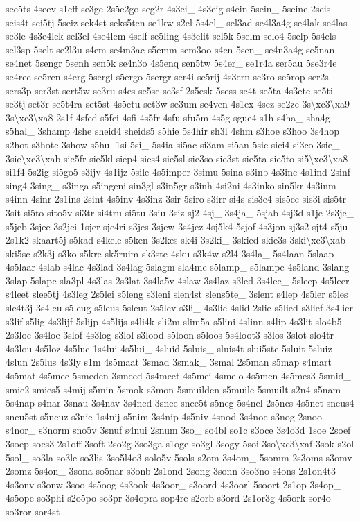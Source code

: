 \begin{DoxyCompactItemize}
see5ts 4seev s1eff se3ge 2s5e2go seg2r 4s3ei\-\_\- 4s3eig s4ein 5sein\-\_\- 5seine 2seis seis4t sei5tj 5seiz sek4st seks5ten se1kw s2el 5s4el\-\_\- sel3ad se4l3a4g se4lak se4las se3le 4s3e4lek sel3el 4se4lem 4self se5ling 4s3elit sel5k 5selm selo4 5selp 5s4els sel3sp 5selt se2l3u s4em se4m3ac s5emm sem3oo s4en 5sen\-\_\- se4n3a4g se5nan se4net 5sengr 5senh sen5k se4n3o 4s5enq sen5tw 5s4er\-\_\- se1r4a ser5au 5se3r4e se4ree se5ren s4erg 5sergl s5ergo 5sergr ser4i se5rij 4s3ern se3ro se5rop ser2s sers3p ser3st sert5w se3ru s4es se5sc se3sf 2s5esk 5sess se4t se5ta 4s3ete se5ti se3tj set3r se5t4ra set5st 4s5etu set3w se3um se4ven 4s1ex 4sez se2ze 3s\textbackslash{}xc3\textbackslash{}xa9 3s\textbackslash{}xc3\textbackslash{}xa8 2s1f 4sfed s5fei 4sfi 4s5fr 4sfu sfu5m 4s5g sgue4 s1h s4ha\-\_\- sha4g s5hal\-\_\- 3shamp 4she sheid4 sheids5 s5hie 5s4hir sh3l 4shm s3hoe s3hoo 3s4hop s2hot s3hote 3show s5hul 1si 5si\-\_\- 5s4ia si5ac si3am si5an 5sic sici4 si3co 3sie\-\_\- 3sie\textbackslash{}xc3\textbackslash{}xab sie5fr sie5kl siep4 sies4 sie5sl sie3so sie3st sie5ta sie5to si5\textbackslash{}xc3\textbackslash{}xa8 si1f4 5s2ig si5go5 s3ijv 4s1ijz 5sile 4s5imper 3simu 5sina s3inb 4s3inc 4s1ind 2sinf sing4 3sing\-\_\- s3inga s5ingeni sin3gl s3in5gr s3inh 4si2ni 4s3inko sin5kr 4s3inm s4inn 4sinr 2s1ins 2sint 4s5inv 4s3inz 3sir 5siro s3irr si4s sis3e4 sis5ee sis3i sis5tr 3sit si5to sito5v si3tr si4tru si5tu 3siu 3siz sj2 4sj\-\_\- 3s4ja\-\_\- 5sjab 4sj3d s1je 2s3je\-\_\- s5jeb 3sjee 3s2jei 1sjer sje4ri s3jes 3sjew 3s4jez 4sj5k4 5sjof 4s3jon sj3s2 sjt4 s5ju 2s1k2 skaart5j s5kad s4kele s5ken 3s2kes sk4i 3s2ki\-\_\- 3skied skie3s 3ski\textbackslash{}xc3\textbackslash{}xab ski5sc s2k3j s3ko s5kre sk5ruim sk3ste 4sku s3k4w s2l4 3s4la\-\_\- 5s4laan 5slaap 4s5laar 4slab s4lac 4s3lad 3s4lag 5slagm sla4me s5lamp\-\_\- s5lampe 4s5land 3slang 3slap 5slape sla3pl 4s3las 2s3lat 3s4la5v 4slaw 3s4laz s3led 3s4lee\-\_\- 5sleep 4s5leer s4leet slee5tj 4s3leg 2s5lei s5leng s3leni slen4st slens5te\-\_\- 3slent s4lep 4s5ler s5les sle4t3j 3s4leu s5leug s5leus 5sleut 2s5lev s3li\-\_\- 4s3lic 4slid 2slie s5lied s3lief 3s4lier s3lif s5lig 4s3lijf 5slijp 4s5lijs s4li4k sli2m slim5a s5lini 4slinn s4lip 4s3lit slo4b5 2s3loc 3s4loe 3slof 4s3log s3lol s3lood s5loon s5loos 5s4loot3 s3los 3slot slo4tr 4s3lou 4s5loz 4s5luc 1s4lui 4s5lui\-\_\- 4sluid 5sluis\-\_\- sluis4t slui5ste 5sluit 5sluiz 4slun 2s5lus 4s3ly s1m 4s5maat 3smad 3smak\-\_\- 3smal 2s5man s5map s4mart 4s5mat 4s5mec 5smeden 3smeed 5s4meet 4s5mei 4smelo 4s5men 4s5mes3 5smid\-\_\- smie2 smies5 s4mij s5min 5smok s3mon 5smuilden s5muile 5smuilt s2n4 s5nam 5s4nap s4nar 3snau 3s4nav 3s4ned 3snee snee5t s5neg 5s4nel 2s5nes 4s5net sneus4 sneu5st s5neuz s3nie 1s4nij s5nim 3s4nip 4s5niv 4snod 3s4noe s3nog 2snoo s4nor\-\_\- s3norm sno5v 3snuf s4nui 2snum 3so\-\_\- so4bl so1c s3oce 3s4o3d 1soe 2soef 3soep soes3 2s1off 3soft 2so2g 3so3ga s1oge so3gl 3sogy 5soi 3so\textbackslash{}xc3\textbackslash{}xaf 3sok s2ol 5sol\-\_\- so3la so3le so3lis 3so5l4o3 solo5v 5sols s2om 3s4om\-\_\- 5somm 2s3oms s3omv 2somz 5s4on\-\_\- 3sona so5nar s3onb 2s1ond 2song 3sonn 3so3no s4ons 2s1on4t3 4s3onv s3onw 3soo 4s5oog 4s3ook 4s3oor\-\_\- s3oord 4s3oorl 5soort 2s1op 3s4op\-\_\- 4s5ope so3phi s2o5po so3pr 3s4opra sop4re s2orb s3ord 2s1or3g 4s5ork sor4o so3ror sor4st 
\end{DoxyCompactItemize}
